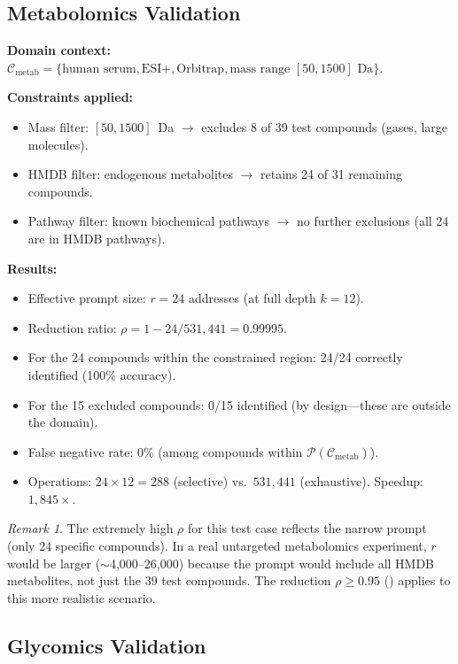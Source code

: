 \documentclass[11pt,twocolumn,a4paper]{article}
\theoremstyle{definition}
\theoremstyle{remark}
\newtheorem{remark}[theorem]{Remark}
\newcommand{\Purpose}{\mathcal{P}}
\newcommand{\Context}{\mathcal{C}}
\begin{document}
\subsection{Metabolomics Validation}\label{sec:metab-validation}

\textbf{Domain context:} $\Context_{\mathrm{metab}} = \{\text{human serum}, \text{ESI+}, \text{Orbitrap}, \text{mass range } [50, 1500] \text{ Da}\}$.

\textbf{Constraints applied:}
\begin{itemize}
  \item Mass filter: $[50, 1500]$~Da $\to$ excludes 8 of 39 test compounds (gases, large molecules).
  \item HMDB filter: endogenous metabolites $\to$ retains 24 of 31 remaining compounds.
  \item Pathway filter: known biochemical pathways $\to$ no further exclusions (all 24 are in HMDB pathways).
\end{itemize}

\textbf{Results:}
\begin{itemize}
  \item Effective prompt size: $r = 24$ addresses (at full depth $k = 12$).
  \item Reduction ratio: $\rho = 1 - 24/531{,}441 = 0.99995$.
  \item For the 24 compounds within the constrained region: 24/24 correctly identified (100\% accuracy).
  \item For the 15 excluded compounds: 0/15 identified (by design---these are outside the domain).
  \item False negative rate: 0\% (among compounds within $\Purpose(\Context_{\mathrm{metab}})$).
  \item Operations: $24 \times 12 = 288$ (selective) vs.\ $531{,}441$ (exhaustive). Speedup: $1{,}845\times$.
\end{itemize}

\begin{remark}
The extremely high $\rho$ for this test case reflects the narrow prompt (only 24 specific compounds). In a real untargeted metabolomics experiment, $r$ would be larger ($\sim$4{,}000--26{,}000) because the prompt would include all HMDB metabolites, not just the 39 test compounds. The reduction $\rho \geq 0.95$ () applies to this more realistic scenario.
\end{remark}

\subsection{Glycomics Validation}\label{sec:glycan-validation}
\end{document}
